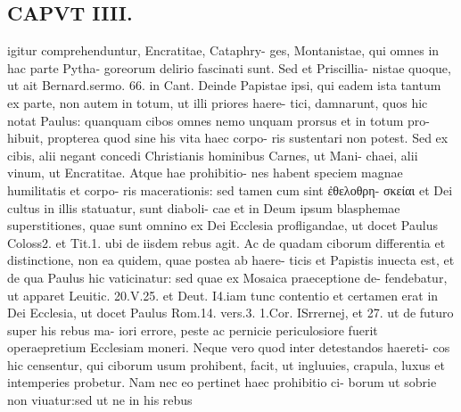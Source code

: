 \documentclass{article}
\begin{document}
\begin{pages}
\section*{CAPVT  IIII. }
\marginpar{[ p.189 ]}igitur comprehenduntur, Encratitae, Cataphry- ges, Montanistae, qui omnes in hac parte Pytha- goreorum delirio fascinati sunt. Sed et Priscillia- nistae quoque, ut ait Bernard.sermo. 66. in Cant. Deinde Papistae ipsi, qui eadem ista tantum ex parte, non autem in totum, ut illi priores haere- tici, damnarunt, quos hic notat Paulus: quanquam cibos omnes nemo unquam prorsus et in totum pro- hibuit, propterea quod sine his vita haec corpo- ris sustentari non potest. Sed ex cibis, alii negant concedi Christianis hominibus Carnes, ut Mani- chaei, alii vinum, ut Encratitae. Atque hae prohibitio- nes habent speciem magnae humilitatis et corpo- ris macerationis: sed tamen cum sint ἐθελοθρη- σκείαι et Dei cultus in illis statuatur, sunt diaboli- cae et in Deum ipsum blasphemae superstitiones, quae sunt omnino ex Dei Ecclesia profligandae, ut docet Paulus Coloss2. et Tit.1. ubi de iisdem rebus agit. Ac de quadam ciborum differentia et distinctione, non ea quidem, quae postea ab haere- ticis et Papistis inuecta est, et de qua Paulus hic vaticinatur: sed quae ex Mosaica praeceptione de- fendebatur, ut apparet Leuitic. 20.V.25. et Deut. I4.iam tunc contentio et certamen erat in Dei Ecclesia, ut docet Paulus Rom.14. vers.3. 1.Cor. ISrrernej, et 27. ut de futuro super his rebus ma- iori errore, peste ac pernicie periculosiore fuerit operaepretium Ecclesiam moneri. Neque vero quod inter detestandos haereti- cos hic censentur, qui ciborum usum prohibent, facit, ut ingluuies, crapula, luxus et intemperies probetur. Nam nec eo pertinet haec prohibitio ci- borum ut sobrie non viuatur:sed ut ne in his rebus 

\end{pages}
\end{document}
